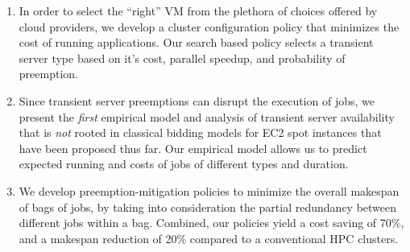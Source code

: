 \begin{enumerate}[leftmargin=12pt]
\item In order to select the ``right'' VM from the plethora of choices offered by cloud providers, we develop a cluster configuration policy that minimizes the cost of running applications. Our search based policy selects a transient server type based on it's cost, parallel speedup, and probability of preemption. 

  
\item Since transient server preemptions can disrupt the execution of jobs, we present the \emph{first} empirical model and analysis of transient server availability that is \emph{not} rooted in classical bidding models for EC2 spot instances that have been proposed thus far. Our empirical model allows us to predict expected running and costs of jobs of different types and duration.

  
\item We develop preemption-mitigation policies to minimize the overall makespan of bags of jobs, by taking into consideration the partial redundancy between different jobs within a bag. Combined, our policies yield a cost saving of 70\%, and a makespan reduction of 20\% compared to a conventional HPC clusters. 

\end{enumerate}




